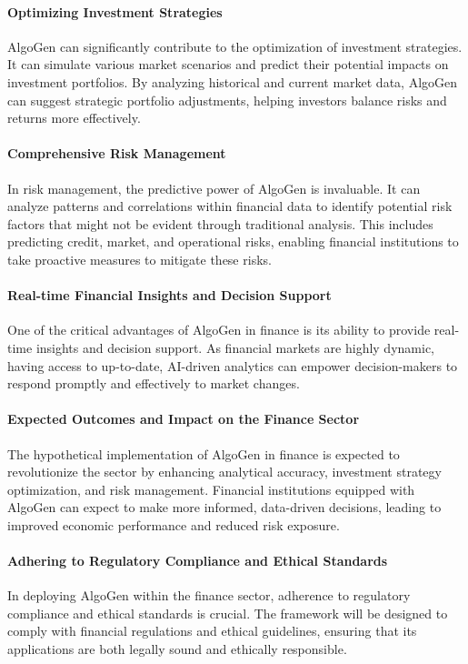 \documentclass{article}
\begin{document}
\paragraph{Optimizing Investment Strategies}
AlgoGen can significantly contribute to the optimization of investment strategies. It can simulate various market scenarios and predict their potential impacts on investment portfolios. By analyzing historical and current market data, AlgoGen can suggest strategic portfolio adjustments, helping investors balance risks and returns more effectively.

\paragraph{Comprehensive Risk Management}
In risk management, the predictive power of AlgoGen is invaluable. It can analyze patterns and correlations within financial data to identify potential risk factors that might not be evident through traditional analysis. This includes predicting credit, market, and operational risks, enabling financial institutions to take proactive measures to mitigate these risks.

\paragraph{Real-time Financial Insights and Decision Support}
One of the critical advantages of AlgoGen in finance is its ability to provide real-time insights and decision support. As financial markets are highly dynamic, having access to up-to-date, AI-driven analytics can empower decision-makers to respond promptly and effectively to market changes.

\paragraph{Expected Outcomes and Impact on the Finance Sector}
The hypothetical implementation of AlgoGen in finance is expected to revolutionize the sector by enhancing analytical accuracy, investment strategy optimization, and risk management. Financial institutions equipped with AlgoGen can expect to make more informed, data-driven decisions, leading to improved economic performance and reduced risk exposure.

\paragraph{Adhering to Regulatory Compliance and Ethical Standards}
In deploying AlgoGen within the finance sector, adherence to regulatory compliance and ethical standards is crucial. The framework will be designed to comply with financial regulations and ethical guidelines, ensuring that its applications are both legally sound and ethically responsible.
\end{document}
